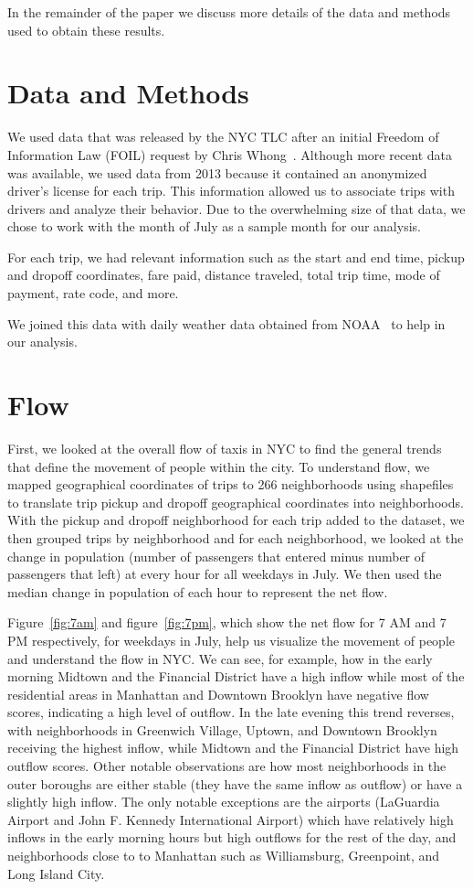 \documentclass[twocolumn]{article}
\begin{document}
In the remainder of the paper we discuss more details of the data and methods used to obtain these results.

\section{Data and Methods}
We used data that was released by the NYC TLC after an initial Freedom of Information Law (FOIL) request by Chris Whong~\cite{Whong:2014}. Although more recent data was available, we used data from 2013 because it contained an anonymized driver’s license for each trip. This information allowed us to associate trips with drivers and analyze their behavior. Due to the overwhelming size of that data, we chose to work with the month of July as a sample month for our analysis. 

For each trip, we had relevant information such as the start and end time, pickup and dropoff coordinates, fare paid, distance traveled, total trip time, mode of payment, rate code, and more.

We joined this data with daily weather data obtained from NOAA~\cite{NOAA:2016} to help in our analysis. 
\section{Flow}
First, we looked at the overall flow of taxis in NYC to find the general trends that define the movement of people within the city. To understand flow, we mapped geographical coordinates of trips to 266 neighborhoods using shapefiles~\cite{PEDIACITIES:2015} to translate trip pickup and dropoff geographical coordinates into neighborhoods. With the pickup and dropoff neighborhood for each trip added to the dataset, we then grouped trips by neighborhood and for each neighborhood, we looked at the change in population (number of passengers that entered minus number of passengers that left) at every hour for all weekdays in July. We then used the median change in population of each hour to represent the net flow.

Figure~\ref{fig:7am} and figure~\ref{fig:7pm}, which show the net flow for 7 AM and 7 PM respectively, for weekdays in July, help us visualize the movement of people and understand the flow in NYC. We can see, for example, how in the early morning Midtown and the Financial District have a high inflow while most of the residential areas in Manhattan and Downtown Brooklyn have negative flow scores, indicating a high level of outflow. In the late evening this trend reverses, with neighborhoods in Greenwich Village, Uptown, and Downtown Brooklyn receiving the highest inflow, while Midtown and the Financial District have high outflow scores. Other notable observations are how most neighborhoods in the outer boroughs are either stable (they have the same inflow as outflow) or have a slightly high inflow. The only notable exceptions are the airports (LaGuardia Airport and John F. Kennedy International Airport) which have relatively high inflows in the early morning hours but high outflows for the rest of the day, and neighborhoods close to to Manhattan such as Williamsburg, Greenpoint, and Long Island City.
\end{document}
